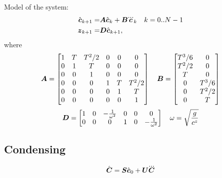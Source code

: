 \documentclass[12pt,a4paper]{article}
\begin{document}
Model of the system:
\begin{align*}
\cstate_{k+1} =& \M{A} \cstate_k + \M{B} \cjerk_k & k = 0..N-1\\
\zmp_{k+1} =& \M{D} \cstate_{k+1}, &
\end{align*}
where
\begin{equation*}
\mbox{\boldmath $A$} = 
\begin{bmatrix}
    1       & T   & T^2/2   & 0 & 0 & 0\\
    0       & 1     & T       & 0 & 0 & 0\\
    0       & 0     & 1         & 0 & 0 & 0\\
    0 & 0 & 0                   & 1       & T   & T^2/2   \\
    0 & 0 & 0                   & 0       & 1     & T       \\
    0 & 0 & 0                   & 0       & 0     & 1         \\
\end{bmatrix}
\quad
\mbox{\boldmath $B$} =
\begin{bmatrix}
    T^3/6 & 0\\
    T^2/2 & 0\\
    T       & 0\\
    0       & T^3/6 \\
    0       & T^2/2 \\
    0       & T       \\
\end{bmatrix}
\end{equation*}
\begin{equation*}
\mbox{\boldmath $D$} = 
\begin{bmatrix}
    1       & 0     & -\frac{1}{\omega^2} & 0 & 0 & 0\\
    0 & 0 & 0                             & 1       & 0     & -\frac{1}{\omega^2}  \\
\end{bmatrix}
\quad
\omega = \sqrt{\frac{g}{c^z}}
\end{equation*}



\subsection{Condensing}

\begin{equation*}
\cState = \M{S} \cstate_0     +   \M{U} \cJerk
\end{equation*}
\end{document}
